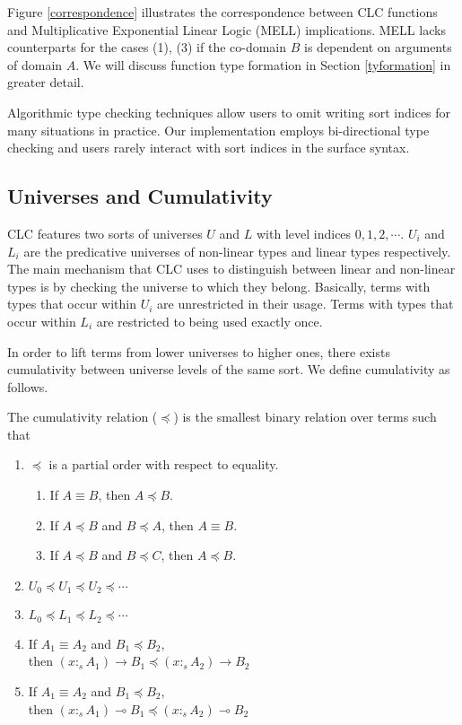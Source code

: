 \documentclass[sigplan,screen,review,anonymous]{acmart}
\newcommand{\stype}[1]{:_#1}
\begin{document}
Figure \ref{correspondence} illustrates the correspondence between CLC functions and Multiplicative Exponential Linear Logic (MELL) implications. MELL lacks counterparts for the cases (1), (3) if the co-domain $B$ is dependent on arguments of domain $A$. We will discuss function type formation in Section \ref{tyformation} in greater detail.

Algorithmic type checking techniques allow users to omit writing sort indices for many situations in practice. Our implementation employs bi-directional type checking and users rarely interact with sort indices in the surface syntax.

\subsection{Universes and Cumulativity}
CLC features two sorts of universes $U$ and $L$ with level indices $0, 1, 2, \cdots$. $U_i$ and $L_i$ are the predicative universes of non-linear types and linear types respectively. The main mechanism that CLC uses to distinguish between linear and non-linear types is by checking the universe to which they belong. Basically, terms with types that occur within $U_i$ are unrestricted in their usage. Terms with types that occur within $L_i$ are restricted to being used exactly once.

In order to lift terms from lower universes to higher ones, there exists cumulativity between universe levels of the same sort. We define cumulativity as follows.

\begin{definition}
  The cumulativity relation ($\preceq$) is the smallest binary relation over terms such that
  \begin{enumerate}
    \item $\preceq$ is a partial order with respect to equality.
          \begin{enumerate}
            \item If $A \equiv B$, then $A \preceq B$.
            \item If $A \preceq B$ and $B \preceq A$, then $A \equiv B$.
            \item If $A \preceq B$ and $B \preceq C$, then $A \preceq B$.
          \end{enumerate}
    \item $U_0 \preceq U_1 \preceq U_2 \preceq \cdots$
    \item $L_0 \preceq L_1 \preceq L_2 \preceq \cdots$
    \item If $A_1 \equiv A_2$ and $B_1 \preceq B_2$, \\ then
          $(x \stype{s} A_1) \rightarrow B_1 \preceq (x \stype{s} A_2) \rightarrow B_2$
    \item If $A_1 \equiv A_2$ and $B_1 \preceq B_2$, \\ then
          $(x \stype{s} A_1) \multimap B_1 \preceq (x \stype{s} A_2) \multimap B_2$
  \end{enumerate}
\end{definition}
\end{document}
